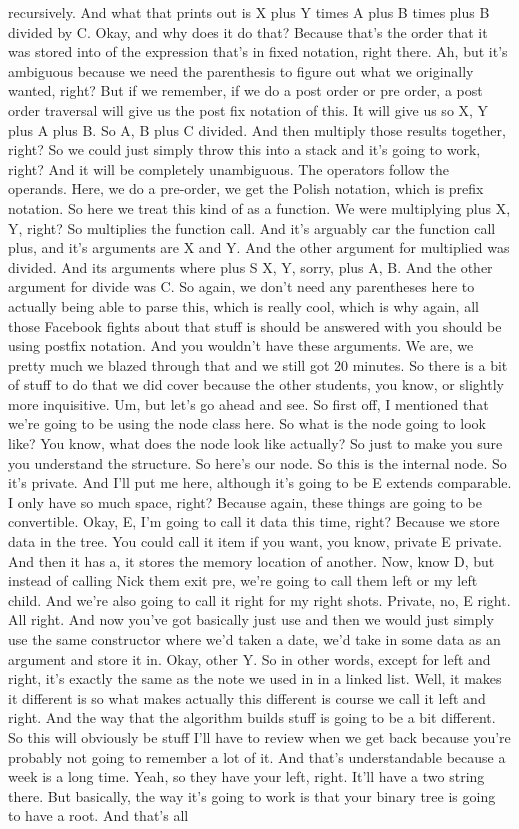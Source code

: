recursively. And what that prints out is X plus Y times A plus B times plus B divided by C. Okay, and why does it do that? Because that's the order that it was stored into of the expression that's in fixed notation, right there. Ah, but it's ambiguous because we need the parenthesis to figure out what we originally wanted, right? But if we remember, if we do a post order or pre order, a post order traversal will give us the post fix notation of this. It will give us so X, Y plus A plus B. So A, B plus C divided. And then multiply those results together, right? So we could just simply throw this into a stack and it's going to work, right? And it will be completely unambiguous. The operators follow the operands. Here, we do a pre-order, we get the Polish notation, which is prefix notation. So here we treat this kind of as a function. We were multiplying plus X, Y, right? So multiplies the function call. And it's arguably car the function call plus, and it's arguments are X and Y. And the other argument for multiplied was divided. And its arguments where plus S X, Y, sorry, plus A, B. And the other argument for divide was C. So again, we don't need any parentheses here to actually being able to parse this, which is really cool, which is why again, all those Facebook fights about that stuff is should be answered with you should be using postfix notation. And you wouldn't have these arguments. We are, we pretty much we blazed through that and we still got 20 minutes. So there is a bit of stuff to do that we did cover because the other students, you know, or slightly more inquisitive. Um, but let's go ahead and see. So first off, I mentioned that we're going to be using the node class here. So what is the node going to look like? You know, what does the node look like actually? So just to make you sure you understand the structure. So here's our node. So this is the internal node. So it's private. And I'll put me here, although it's going to be E extends comparable. I only have so much space, right? Because again, these things are going to be convertible. Okay, E, I'm going to call it data this time, right? Because we store data in the tree. You could call it item if you want, you know, private E private. And then it has a, it stores the memory location of another. Now, know D, but instead of calling Nick them exit pre, we're going to call them left or my left child. And we're also going to call it right for my right shots. Private, no, E right. All right. And now you've got basically just use and then we would just simply use the same constructor where we'd taken a date, we'd take in some data as an argument and store it in. Okay, other Y. So in other words, except for left and right, it's exactly the same as the note we used in in a linked list. Well, it makes it different is so what makes actually this different is course we call it left and right. And the way that the algorithm builds stuff is going to be a bit different. So this will obviously be stuff I'll have to review when we get back because you're probably not going to remember a lot of it. And that's understandable because a week is a long time. Yeah, so they have your left, right. It'll have a two string there. But basically, the way it's going to work is that your binary tree is going to have a root. And that's all 